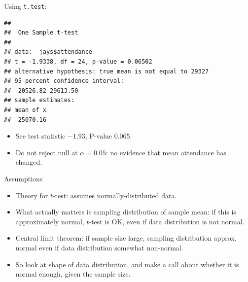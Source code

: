 \documentclass[
  ignorenonframetext,
]{beamer}
\newenvironment{Shaded}{\begin{snugshade}}{\end{snugshade}}
\newcommand{\DataTypeTok}[1]{\textcolor[rgb]{0.13,0.29,0.53}{#1}}
\newcommand{\DecValTok}[1]{\textcolor[rgb]{0.00,0.00,0.81}{#1}}
\newcommand{\KeywordTok}[1]{\textcolor[rgb]{0.13,0.29,0.53}{\textbf{#1}}}
\newcommand{\NormalTok}[1]{#1}
\newcommand{\OperatorTok}[1]{\textcolor[rgb]{0.81,0.36,0.00}{\textbf{#1}}}
\providecommand{\tightlist}{%
  \setlength{\itemsep}{0pt}\setlength{\parskip}{0pt}}
\begin{document}
\begin{frame}[fragile]{Using \texttt{t.test}:}
\protect\hypertarget{using-t.test}{}

\begin{Shaded}
\end{Shaded}

\begin{verbatim}
## 
##  One Sample t-test
## 
## data:  jays$attendance
## t = -1.9338, df = 24, p-value = 0.06502
## alternative hypothesis: true mean is not equal to 29327
## 95 percent confidence interval:
##  20526.82 29613.50
## sample estimates:
## mean of x 
##  25070.16
\end{verbatim}

\begin{itemize}
\tightlist
\item
  See test statistic \(-1.93\), P-value 0.065.
\item
  Do not reject null at \(\alpha=0.05\): no evidence that mean
  attendance has changed.
\end{itemize}

\end{frame}

\begin{frame}{Assumptions}
\protect\hypertarget{assumptions}{}

\begin{itemize}
\tightlist
\item
  Theory for \(t\)-test: assumes normally-distributed data.
\item
  What actually matters is sampling distribution of sample mean: if this
  is approximately normal, \(t\)-test is OK, even if data distribution
  is not normal.
\item
  Central limit theorem: if sample size large, sampling distribution
  approx. normal even if data distribution somewhat non-normal.
\item
  So look at shape of data distribution, and make a call about whether
  it is normal enough, given the sample size.
\end{itemize}

\end{frame}
\end{document}
